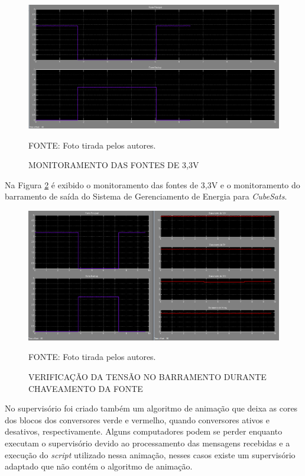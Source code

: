 \documentclass[
	12pt,				%
	openright,			%
	oneside,			%
	a4paper,			%
	english,			%
	french,				%
	spanish,			%
	brazil,				%
	oldfontcommands
	]{abntex2}
\begin{document}
	\begin{figure}[th]
		\caption{MONITORAMENTO DAS FONTES DE 3,3V}
		\label{Fig_3v3}
		\centering
		\includegraphics[width=1.0\linewidth]{./figs/3v3}
			
		\begin{small}
			FONTE: Foto tirada pelos autores.
		\end{small}		
	\end{figure}
	
	Na Figura \ref{Fig_ch} é exibido o monitoramento das fontes de 3,3V e o monitoramento do barramento de saída do Sistema de Gerenciamento de Energia para \textit{CubeSats}.
	
	\begin{figure}[th]
		\caption{VERIFICAÇÃO DA TENSÃO NO BARRAMENTO DURANTE CHAVEAMENTO DA FONTE}
		\label{Fig_ch}
		\centering
		\includegraphics[width=1.0\linewidth]{./figs/ch}
			
		\begin{small}
			FONTE: Foto tirada pelos autores.
		\end{small}		
	\end{figure}
	\pagebreak
	
	No supervisório foi criado também um algoritmo de animação que deixa as cores dos blocos dos conversores verde e vermelho, quando conversores ativos e desativos, respectivamente. Alguns computadores podem se perder enquanto executam o supervisório devido ao processamento das mensagens recebidas e a execução do \textit{script} utilizado nessa animação, nesses casos existe um supervisório adaptado que não contém o algoritmo de animação. 
\end{document}
